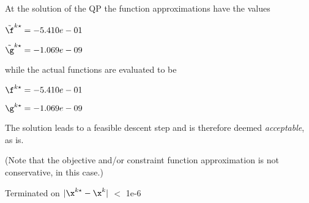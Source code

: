 At the solution of the QP the function approximations have the values

$\tilde \f^{k\star} = -5.410e-01$

$\tilde \g^{k\star} = -1.069e-09$

\bigskip
while the actual functions are evaluated to be

$\f^{k\star} = -5.410e-01$

$\g^{k\star} = -1.069e-09$

\bigskip
 The solution leads to a feasible descent step and                     is therefore deemed \emph{acceptable}, as is. 
 
(Note that the objective and/or constraint function approximation                         is not conservative, in this case.)

 \bigskip Terminated on $| \x^{k\star} - \x^{k}|$ $<$ 1e-6
